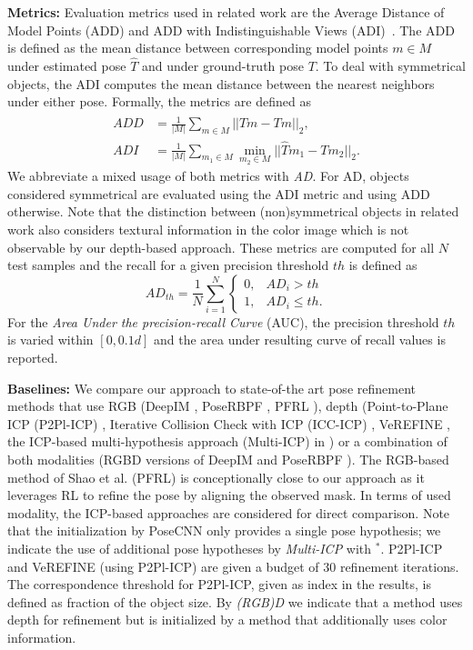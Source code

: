\documentclass[10pt,twocolumn,letterpaper]{article}
\begin{document}
\textbf{Metrics:} Evaluation metrics used in related work are the Average Distance of Model Points (ADD) and ADD with Indistinguishable Views (ADI)~\cite{hinterstoisser2012adi}. The ADD is defined as the mean distance between corresponding model points $m \in M$ under estimated pose $\hat{T}$ and under ground-truth pose $T$. To deal with symmetrical objects, the ADI computes the mean distance between the nearest neighbors under either pose. Formally, the metrics are defined as
\begin{equation}
\begin{split}
    ADD &= \frac{1}{|M|} \sum_{m \in M} ||\hat{T}m - Tm||_2,\\
    ADI &= \frac{1}{|M|} \sum_{m_1 \in M} \min_{m_2 \in M} ||\hat{T}m_1 - Tm_2||_2.
\end{split}
\end{equation}
We abbreviate a mixed usage of both metrics with \textit{AD}. For AD, objects considered symmetrical are evaluated using the ADI metric and using ADD otherwise. Note that the distinction between (non)symmetrical objects in related work also considers textural information in the color image which is not observable by our depth-based approach. %
These metrics are computed for all $N$ test samples and the recall for a given precision threshold $th$ is defined as
\begin{equation}
    AD_{th} = \frac{1}{N} \sum_{i=1}^N \begin{cases}
       0, & AD_i > th\\
       1, & AD_i \leq th.
    \end{cases}
\end{equation}
For the \textit{Area Under the precision-recall Curve} (AUC), the precision threshold $th$ is varied within $[0,0.1d]$ and the area under resulting curve of recall values is reported.

\textbf{Baselines:} We compare our approach to state-of-the art pose refinement methods that use RGB (DeepIM \cite{li2018deepim}, PoseRBPF \cite{deng2021poserbpf}, PFRL \cite{shao2020pfrl}), depth (Point-to-Plane ICP (P2Pl-ICP) \cite{chen1992p2pl,open3d}, Iterative Collision Check with ICP (ICC-ICP) \cite{wada2020morefusion}, VeREFINE \cite{bauer2020verefine}, the ICP-based multi-hypothesis approach (Multi-ICP) in \cite{xiang2017posecnn}) or a combination of both modalities (RGBD versions of DeepIM \cite{li2018deepim} and PoseRBPF \cite{deng2021poserbpf}). The RGB-based method of Shao et al. \cite{shao2020pfrl} (PFRL) is conceptionally close to our approach as it leverages RL to refine the pose by aligning the observed mask. In terms of used modality, the ICP-based approaches are considered for direct comparison. Note that the initialization by PoseCNN \cite{xiang2017posecnn} only provides a single pose hypothesis; we indicate the use of additional pose hypotheses by \textit{Multi-ICP} with $^*$. P2Pl-ICP and VeREFINE (using P2Pl-ICP) are given a budget of 30 refinement iterations. The correspondence threshold for P2Pl-ICP, given as index in the results, is defined as fraction of the object size. By \textit{(RGB)D} we indicate that a method uses depth for refinement but is initialized by a method that additionally uses color information.
\end{document}
